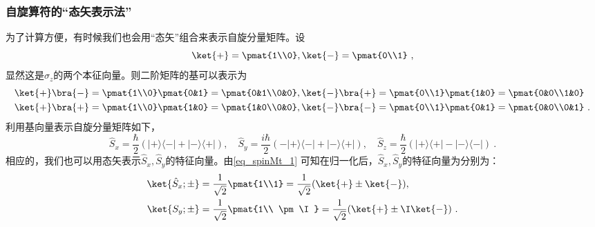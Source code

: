 \subsubsection{自旋算符的“态矢表示法”}
为了计算方便，有时候我们也会用“态矢”组合来表示自旋分量矩阵。设
\begin{equation}
\ket{+}=\pmat{1\\0},\ket{-}=\pmat{0\\1}~,
\end{equation}
显然这是$\hat \sigma_z$的两个本征向量。则二阶矩阵的基可以表示为
\begin{equation}
\begin{aligned}
\ket{+}\bra{-}&=\pmat{1\\0}\pmat{0&1}=\pmat{0&1\\0&0},\ket{-}\bra{+}=\pmat{0\\1}\pmat{1&0}=\pmat{0&0\\1&0}\\
\ket{+}\bra{+}&=\pmat{1\\0}\pmat{1&0}=\pmat{1&0\\0&0},\ket{-}\bra{-}=\pmat{0\\1}\pmat{0&1}=\pmat{0&0\\0&1}~.
\end{aligned}
\end{equation}
利用基向量表示自旋分量矩阵如下，
\begin{equation}
\hat S_{x}=\frac{\hbar}{2}(|+\rangle\langle-|+|-\rangle\langle+|), \quad \hat S_{y}=\frac{i \hbar}{2}(-|+\rangle\langle-|+|-\rangle\langle+|), \quad 
\hat S_{z}=\frac{\hbar}{2}(|+\rangle\langle+|-|-\rangle\langle-|)~.
\end{equation}
相应的，我们也可以用态矢表示$\hat S_x,\hat S_y$的特征向量。由\autoref{eq_spinMt_1} 可知在归一化后，$\hat S_x,\hat S_y$的特征向量为分别为：
\begin{equation}
\begin{aligned}
\ket {\hat S_x;\pm}&=\frac{1}{\sqrt{2}}\pmat{1\\1}=\frac{1}{\sqrt{2}}(\ket{+}\pm \ket{-}),\\
\ket{S_y;\pm}&=\frac{1}{\sqrt{2}}\pmat{1\\ \pm \I}=\frac{1}{\sqrt 2}(\ket{+}\pm \I \ket{-})~.
\end{aligned}
\end{equation}

